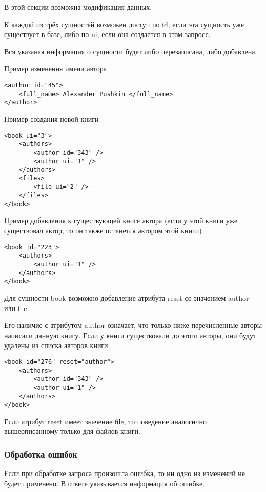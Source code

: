 В этой секции возможна модификация данных. 

К каждой из трёх сущностей возможен доступ по id, если эта сущность уже существует в базе, либо по ui, если она создается в этом запросе. 

Вся указаная информация о сущности будет либо перезаписана, либо добавлена. 

Пример изменения имени автора 
\begin{verbatim}
<author id="45">
    <full_name> Alexander Pushkin </full_name>
</author>
\end{verbatim}

Пример создания новой книги 
\begin{verbatim}
<book ui="3">
    <authors>
        <author id="343" />
        <author ui="1" />
    </authors>
    <files>
        <file ui="2" />
    </files>
</book>
\end{verbatim}

Пример добавления к существующей книге автора (если у этой книги уже существовал автор, то он также останется автором этой книги) 
\begin{verbatim}
<book id="223">
    <authors>
        <author ui="1" />
    </authors>
</book>
\end{verbatim}

Для сущности book возможно добавление атрибута reset со значением author или file. 

Его наличие с атрибутом author означает, что только ниже перечисленные авторы написали данную книгу. Если у книги существовали до этого авторы, они будут удалены из списка авторов книги. 
\begin{verbatim}
<book id="276" reset="author">
    <authors>
        <author id="343" />
        <author ui="1" />
    </authors>
</book>
\end{verbatim}

Если атрибут reset имеет значение file, то поведение аналогично вышеописанному только для файлов книги. 

\subsubsection{Обработка ошибок}

Если при обработке запроса произошла ошибка, то ни одно из изменений не будет применено. 
В ответе указывается информация об ошибке.
